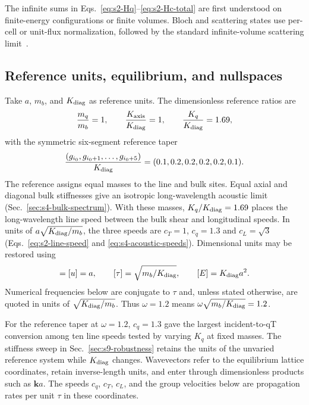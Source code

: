 \documentclass[10pt,aps,onecolumn,floatfix,notitlepage,nofootinbib,showkeys]{revtex4-2}
\newcommand{\vk}{\bm{k}}
\begin{document}
The infinite sums in Eqs.~\eqref{eq:s2-Hq}--\eqref{eq:s2-Hc-total} are first understood on finite-energy configurations or finite volumes. Bloch and scattering states use per-cell or unit-flux normalization, followed by the standard infinite-volume scattering limit~\cite{Ong2018,Sadasivam2017,Khodavirdi2024}.

\subsection{Reference units, equilibrium, and nullspaces}
\label{sec:s2-units-nullspaces}

Take $a$, $m_b$, and $K_{\rm diag}$ as reference units. The dimensionless reference ratios are
\begin{equation}
  \frac{m_q}{m_b}=1,
  \qquad
  \frac{K_{\rm axis}}{K_{\rm diag}}=1,
  \qquad
  \frac{K_q}{K_{\rm diag}}=1.69,
  \label{eq:s2-ratios}
\end{equation}
with the symmetric six-segment reference taper
\begin{equation}
  \frac{(g_{i_0},g_{i_0+1},\ldots,g_{i_0+5})}{K_{\rm diag}}
  =(0.1,0.2,0.2,0.2,0.2,0.1).
  \label{eq:s2-g-profile}
\end{equation}
The reference assigns equal masses to the line and bulk sites. Equal axial and diagonal bulk stiffnesses give an isotropic long-wavelength acoustic limit (Sec.~\ref{sec:s4-bulk-spectrum}). With these masses, $K_q/K_{\rm diag}=1.69$ places the long-wavelength line speed between the bulk shear and longitudinal speeds. In units of $a\sqrt{K_{\rm diag}/m_b}$, the three speeds are $c_T=1$, $c_q=1.3$ and $c_L=\sqrt{3}$ (Eqs.~\eqref{eq:s2-line-speed} and \eqref{eq:s4-acoustic-speeds}). Dimensional units may be restored using
\begin{equation}
  [q]=[u]=a,
  \qquad
  [\tau]=\sqrt{m_b/K_{\rm diag}},
  \qquad
  [E]=K_{\rm diag}a^2.
  \label{eq:s2-units}
\end{equation}
Numerical frequencies below are conjugate to $\tau$ and, unless stated otherwise, are quoted in units of $\sqrt{K_{\rm diag}/m_b}$. Thus $\omega=1.2$ means $\omega\sqrt{m_b/K_{\rm diag}}=1.2$.

For the reference taper at $\omega=1.2$, $c_q=1.3$ gave the largest incident-to-qT conversion among ten line speeds tested by varying $K_q$ at fixed masses. The stiffness sweep in Sec.~\ref{sec:s9-robustness} retains the units of the unvaried reference system while $K_{\rm diag}$ changes. Wavevectors refer to the equilibrium lattice coordinates, retain inverse-length units, and enter through dimensionless products such as $\vk a$. The speeds $c_q$, $c_T$, $c_L$, and the group velocities below are propagation rates per unit $\tau$ in these coordinates.
\end{document}
